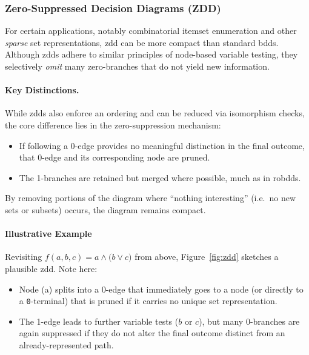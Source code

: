 \subsubsection{Zero-Suppressed Decision Diagrams (ZDD)}
\label{sec:zdd}

For certain applications, notably combinatorial itemset enumeration and other \emph{sparse} set representations, \acrfull{zdd} can be more compact than standard \acrshort{bdd}s. Although \acrshort{zdd}s adhere to similar principles of node-based variable testing, they selectively \emph{omit} many zero-branches that do not yield new information.

\paragraph{Key Distinctions.}
While \acrshort{zdd}s also enforce an ordering and can be reduced via isomorphism checks, the core difference lies in the zero-suppression mechanism:
\begin{itemize}
\item If following a 0-edge provides no meaningful distinction in the final outcome, that 0-edge and its corresponding node are pruned.
\item The 1-branches are retained but merged where possible, much as in \acrshort{robdd}s.
\end{itemize}
By removing portions of the diagram where “nothing interesting” (i.e.\ no new sets or subsets) occurs, the diagram remains compact.

\paragraph{Illustrative Example}
Revisiting $f(a,b,c)=a \land \bigl(b \lor c\bigr)$ from above, Figure~\ref{fig:zdd} sketches a plausible \acrshort{zdd}. Note here:
\begin{itemize}
\item Node (a) splits into a 0-edge that immediately goes to a node (or directly to a \texttt{0}-terminal) that is pruned if it carries no unique set representation.
\item The 1-edge leads to further variable tests ($b$ or $c$), but many 0-branches are again suppressed if they do not alter the final outcome distinct from an already-represented path.
\end{itemize}

